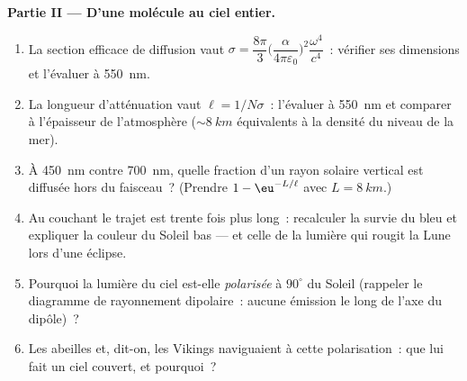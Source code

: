 \begin{problem}
\medskip\noindent\textbf{Partie II --- D'une molécule au ciel
entier.}
\begin{enumerate}[resume]
  \item La section efficace de diffusion vaut $\sigma =
        \dfrac{8\pi}{3}\Big(\dfrac{\alpha}{4\pi\varepsilon_0}
        \Big)^2\dfrac{\omega^4}{c^4}$~: vérifier ses dimensions et
        l'évaluer à \qty{550}{nm}.
  \item La longueur d'atténuation vaut $\ell = 1/N\sigma$~:
        l'évaluer à \qty{550}{nm} et comparer à l'épaisseur de
        l'atmosphère ($\sim\qty{8}{km}$ équivalents à la densité du
        niveau de la mer).
  \item À \qty{450}{nm} contre \qty{700}{nm}, quelle fraction d'un
        rayon solaire vertical est diffusée hors du faisceau~? (Prendre $1 -
        \eu^{-L/\ell}$ avec $L = \qty{8}{km}$.)
  \item Au couchant le trajet est trente fois plus long~: recalculer
        la survie du bleu et expliquer la couleur du Soleil bas ---
        et celle de la lumière qui rougit la Lune lors d'une éclipse.
  \item Pourquoi la lumière du ciel est-elle \emph{polarisée} à
        $90^\circ$ du Soleil (rappeler le diagramme de
        rayonnement dipolaire~: aucune émission le long de l'axe du
        dipôle)~?
  \item Les abeilles et, dit-on, les Vikings naviguaient à cette
        polarisation~: que lui fait un ciel couvert, et pourquoi~?
\end{enumerate}


\end{problem}
